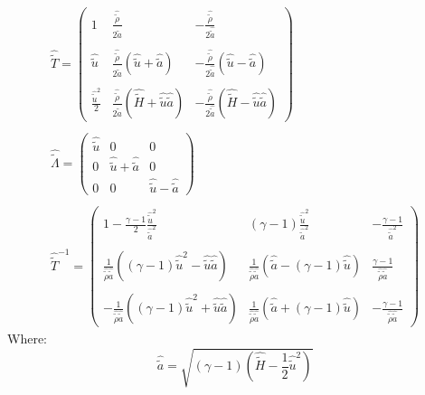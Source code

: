 \documentclass[11pt, a4paper]{article}
\begin{document}
\begin{equation}
    \begin{array}{c}
        \hat{\tilde{T}}=\begin{pmatrix}
            1 & \displaystyle\frac{\hat{\tilde{\rho}}}{2\hat{\tilde{a}}} & \displaystyle-\frac{\hat{\tilde{\rho}}}{2\hat{\tilde{a}}} \\\\
            \hat{\tilde{u}} & \displaystyle\frac{\hat{\tilde{\rho}}}{2\hat{\tilde{a}}}\left(\hat{\tilde{u}}+\hat{\tilde{a}}\right) & \displaystyle-\frac{\hat{\tilde{\rho}}}{2\hat{\tilde{a}}}\left(\hat{\tilde{u}}-\hat{\tilde{a}}\right) \\\\
            \displaystyle\frac{\hat{\tilde{u}}^2}{2} & \displaystyle\frac{\hat{\tilde{\rho}}}{2\hat{\tilde{a}}}\left(\hat{\tilde{H}}+\hat{\tilde{u}}\hat{\tilde{a}}\right) & \displaystyle-\frac{\hat{\tilde{\rho}}}{2\hat{\tilde{a}}}\left(\hat{\tilde{H}}-\hat{\tilde{u}}\hat{\tilde{a}}\right)
        \end{pmatrix} \\\\
        \hat{\tilde{\Lambda}}=\begin{pmatrix}
            \hat{\tilde{u}} & 0 & 0 \\
            0 & \hat{\tilde{u}}+\hat{\tilde{a}} & 0 \\
            0 & 0 & \hat{\tilde{u}}-\hat{\tilde{a}}
        \end{pmatrix} \\\\
        \hat{\tilde{T}}^{-1}=\begin{pmatrix}
            \displaystyle1-\frac{\gamma-1}{2}\frac{\hat{\tilde{u}}^2}{\hat{\tilde{a}}^2} & \displaystyle\left(\gamma-1\right)\frac{\hat{\tilde{u}}^2}{\hat{\tilde{a}}^2} & \displaystyle-\frac{\gamma-1}{\hat{\tilde{a}}^2} \\\\
            \displaystyle\frac{1}{\hat{\tilde{\rho}}\hat{\tilde{a}}}\left(\left(\gamma-1\right)\hat{\tilde{u}}^2-\hat{\tilde{u}}\hat{\tilde{a}}\right) & \displaystyle\frac{1}{\hat{\tilde{\rho}}\hat{\tilde{a}}}\left(\hat{\tilde{a}}-\left(\gamma-1\right)\hat{\tilde{u}}\right) & \displaystyle\frac{\gamma-1}{\hat{\tilde{\rho}}\hat{\tilde{a}}} \\\\
            \displaystyle-\frac{1}{\hat{\tilde{\rho}}\hat{\tilde{a}}}\left(\left(\gamma-1\right)\hat{\tilde{u}}^2+\hat{\tilde{u}}\hat{\tilde{a}}\right) & \displaystyle\frac{1}{\hat{\tilde{\rho}}\hat{\tilde{a}}}\left(\hat{\tilde{a}}+\left(\gamma-1\right)\hat{\tilde{u}}\right) & \displaystyle-\frac{\gamma-1}{\hat{\tilde{\rho}}\hat{\tilde{a}}}
        \end{pmatrix}
    \end{array}
\end{equation}
Where:
\begin{equation*}
    \hat{\tilde{a}}=\sqrt{\left(\gamma-1\right)\left(\hat{\tilde{H}}-\frac{1}{2}\hat{\tilde{u}}^2\right)}
\end{equation*}
\end{document}
